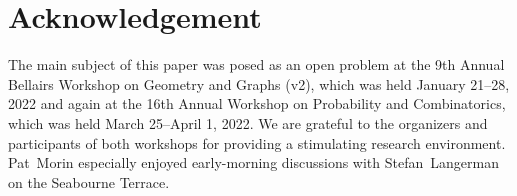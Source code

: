 \documentclass{patmorin}
\begin{document}
\section*{Acknowledgement}

The main subject of this paper was posed as an open problem at the 9th Annual Bellairs Workshop on Geometry and Graphs (v2), which was held January 21--28, 2022 and again at the 16th Annual Workshop on Probability and Combinatorics, which was held March 25--April 1, 2022. We are grateful to the organizers and participants of both workshops for providing a stimulating research environment. Pat~Morin especially enjoyed early-morning discussions with Stefan~Langerman on the Seabourne Terrace.




\end{document}
